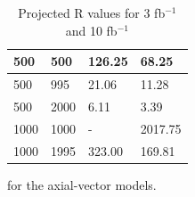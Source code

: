 \begin{table}[h!]
\begin{tabular}{llll}
500  &     500  &     126.25  &  68.25 \\\hline
500  &     995  &     21.06  &   11.28 \\\hline
500  &     2000  &    6.11  &    3.39 \\\hline
1000 &   1000    &-         & 2017.75 \\ \hline
1000  &    1995  &    323.00  &  169.81 \\\hline
\end{tabular}
\caption{Projected R values for 3 fb$^{-1}$ and 10 fb$^{-1}$} for the axial-vector models.
\label{tab:dm_A_R_values}
\end{table}


